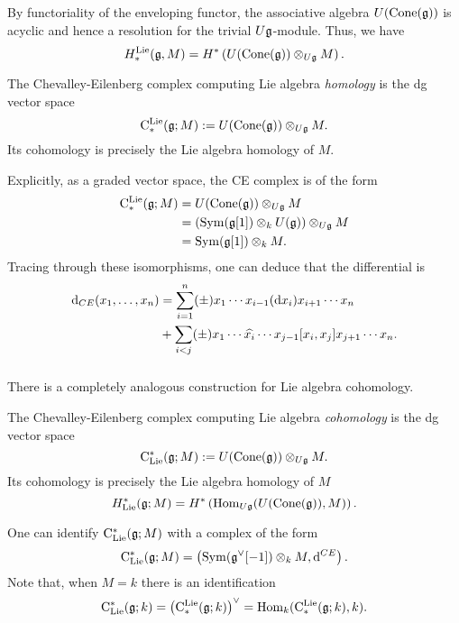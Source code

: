 \documentclass[11pt]{amsart}
\begin{document}
By functoriality of the enveloping functor, the associative algebra $U({\rm Cone}(\mathfrak g))$ is acyclic and hence a resolution for the trivial $U \mathfrak g$-module.
Thus, we have
\[
H^{\rm Lie}_*(\mathfrak g, M) = H^*\left(U({\rm Cone}(\mathfrak g)) \otimes_{U \mathfrak g} M \right) .
\] 

\begin{dfn}
The Chevalley-Eilenberg complex computing Lie algebra {\em homology} is the dg vector space
\[
{\rm C}^{\rm Lie}_*(\mathfrak g ; M) := U({\rm Cone}(\mathfrak g)) \otimes_{U \mathfrak g} M .
\] 
Its cohomology is precisely the Lie algebra homology of $M$.
\end{dfn}

\begin{rmk}
Explicitly, as a graded vector space, the CE complex is of the form
\begin{align*}
{\rm C}^{\rm Lie}_*(\mathfrak g ; M) & = U({\rm Cone}(\mathfrak g)) \otimes_{U \mathfrak g} M  \\ & = \left({\rm Sym}(\mathfrak g[1]) \otimes_k U(\mathfrak g)\right) \otimes_{U \mathfrak g} M \\ &= {\rm Sym}(\mathfrak g[1]) \otimes_k M .
\end{align*}
Tracing through these isomorphisms, one can deduce that the differential is
\begin{align*}
{\rm d}_{CE} (x_1,\ldots, x_n) & = \sum_{i = 1}^n (\pm) x_1 \cdots x_{i-1} ({\rm d} x_i) x_{i+1} \cdots x_n \\ & + \sum_{i < j} (\pm) x_1\cdots \widehat{x_i} \cdots x_{j-1} [x_i,x_j] x_{j+1} \cdots x_n .
\end{align*}
\end{rmk}

\subsubsection{}

There is a completely analogous construction for Lie algebra cohomology. 

\begin{dfn}
The Chevalley-Eilenberg complex computing Lie algebra {\em cohomology} is the dg vector space
\[
{\rm C}_{{\rm Lie}}^*(\mathfrak g ; M) := U({\rm Cone}(\mathfrak g)) \otimes_{U \mathfrak g} M .
\] 
Its cohomology is precisely the Lie algebra homology of $M$
\[
H_{\rm Lie}^*(\mathfrak g ; M) = H^*\left({\rm Hom}_{U \mathfrak g}(U({\rm Cone}(\mathfrak g)), M)\right) .
\]
\end{dfn}

\begin{rmk}
One can identify ${\rm C}_{{\rm Lie}}^*(\mathfrak g ; M)$ with a complex of the form
\[
{\rm C}_{{\rm Lie}}^*(\mathfrak g ; M) = \left({\rm Sym}(\mathfrak g^\vee[-1]) \otimes_k M , {\rm d}^{CE}\right) .
\]
Note that, when $M = k$ there is an identification 
\[
{\rm C}_{{\rm Lie}}^*(\mathfrak g ; k) = \left({\rm C}^{\rm Lie}_*(\mathfrak g ; k)\right)^\vee = {\rm Hom}_k({\rm C}^{\rm Lie}_*(\mathfrak g ;k), k) .
\] 
\end{rmk}
\end{document}
